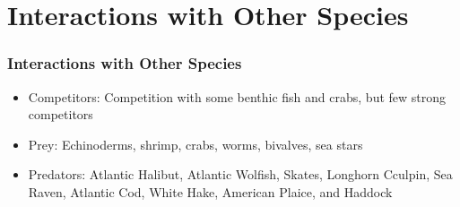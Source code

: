 \documentclass{beamer}
\numberwithin{equation}{section}		%
\numberwithin{figure}{section}	   	%
\numberwithin{table}{section}				%
\begin{document}
\section{Interactions with Other Species}
\begin{frame}
\frametitle{Interactions with Other Species}

\begin{itemize}
	\item Competitors: Competition with some benthic fish and crabs, but few strong competitors
	\item Prey: Echinoderms, shrimp, crabs, worms, bivalves, sea stars
	\item Predators: Atlantic Halibut, Atlantic Wolfish, Skates, Longhorn Cculpin, Sea Raven, Atlantic Cod, White Hake, American Plaice, and Haddock
\end{itemize}
\end{frame}

\end{document}
